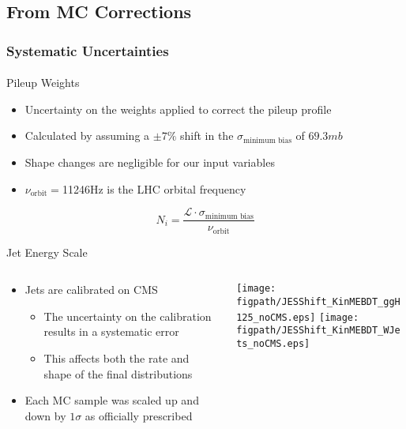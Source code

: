 

\subsection*{From MC Corrections}


\begin{frame}
	\frametitle{Systematic Uncertainties}
	\framesubtitle{}
	\vspace*{-0.54cm}
	\begin{block}{Pileup Weights}
		\begin{itemize}
			\footnotesize
			\item Uncertainty on the weights applied to correct the pileup profile
			\item Calculated by assuming a $\pm7\%$ shift in the $\sigma_{\text{minimum bias}}$ of $69.3\unit{mb}$
			\item Shape changes are negligible for our input variables
			\item $\nu_{\text{orbit}}=$11246\unit{Hz} is the LHC orbital frequency
		\end{itemize}
		\begin{equation}
			N_{i} = \frac{\mathcal{L}\cdot\sigma_{\text{minimum bias}}}{\nu_{\text{orbit}}}
		\end{equation}
	\end{block}
	\begin{block}{Jet Energy Scale}
		\begin{columns}[T]
			\begin{column}{0.48\textwidth}
				\begin{itemize}
					\footnotesize
					\item Jets are calibrated on CMS
					\begin{itemize}
						\footnotesize
						\item The uncertainty on the calibration results in a systematic error
						\item This affects both the rate and shape of the final distributions
					\end{itemize}
					\item Each MC sample was scaled up and down by $1\sigma$ as officially prescribed
				\end{itemize}
			\end{column}
			\begin{column}{0.48\textwidth}
				\texttt{[image: \\figpath/JESShift\_KinMEBDT\_ggH125\_noCMS.eps]}
				\texttt{[image: \\figpath/JESShift\_KinMEBDT\_WJets\_noCMS.eps]}
			\end{column}
		\end{columns}
	\end{block}
\end{frame}

